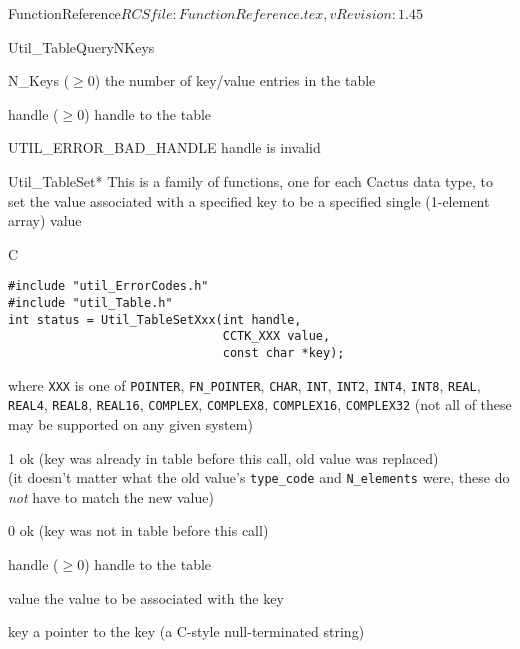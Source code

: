 \begin{cactuspart}{5}{FunctionReference}{$RCSfile: FunctionReference.tex,v $}{$Revision: 1.45 $}
\begin{FunctionDescription}{Util\_TableQueryNKeys}
\begin{Result}{N\_Keys ($\ge 0$)}
the number of key/value entries in the table
\end{Result}

\begin{Parameter}{handle ($\ge 0$)}
handle to the table
\end{Parameter}

\begin{Discussion}
\end{Discussion}

\begin{Error}{UTIL\_ERROR\_BAD\_HANDLE}
handle is invalid
\end{Error}
\end{FunctionDescription}


\begin{FunctionDescription}{Util\_TableSet*}
\label{Util-TableSet*}
This is a family of functions, one for each Cactus data type,
to set the value associated with a specified key to be a specified
single (1-element array) value

\begin{Synopsis}{C}
\begin{verbatim}
#include "util_ErrorCodes.h"
#include "util_Table.h"
int status = Util_TableSetXxx(int handle,
                              CCTK_XXX value,
                              const char *key);
\end{verbatim}
where \verb|XXX| is one of
   \verb|POINTER|, \verb|FN_POINTER|,
   \verb|CHAR|,
   \verb|INT|, \verb|INT2|, \verb|INT4|, \verb|INT8|,
   \verb|REAL|, \verb|REAL4|, \verb|REAL8|, \verb|REAL16|,
   \verb|COMPLEX|, \verb|COMPLEX8|, \verb|COMPLEX16|, \verb|COMPLEX32|
(not all of these may be supported on any given system)
\end{Synopsis}

\begin{Result}{\rm 1}
ok (key was already in table before this call, old value was replaced)\\
   (it doesn't matter what the old value's \verb|type_code| and
    \verb|N_elements| were, \ie{} these do {\em not\/} have to match
    the new value)
\end{Result}
\begin{Result}{\rm 0}
ok (key was not in table before this call)
\end{Result}

\begin{Parameter}{handle ($\ge 0$)}
handle to the table
\end{Parameter}
\begin{Parameter}{value}
the value to be associated with the key
\end{Parameter}
\begin{Parameter}{key}
a pointer to the key (a C-style null-terminated string)
\end{Parameter}


\end{FunctionDescription}
\end{cactuspart}
